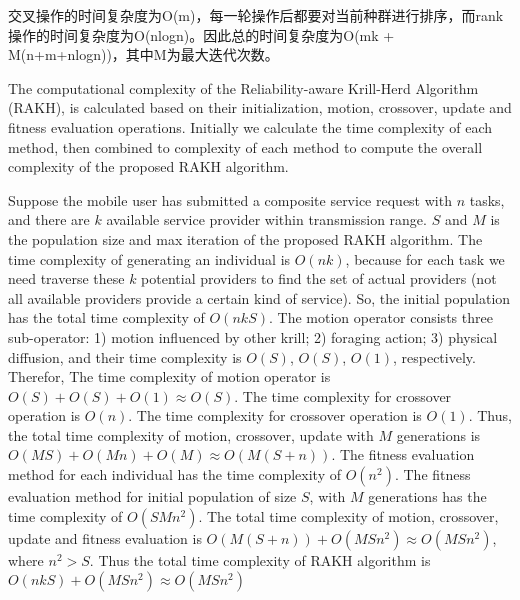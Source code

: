 \documentclass[journal]{IEEEtran}
\begin{document}
交叉操作的时间复杂度为O(m)，每一轮操作后都要对当前种群进行排序，而rank操作的时间复杂度为O(nlogn)。因此总的时间复杂度为O(mk + M(n+m+nlogn))，其中M为最大迭代次数。

The computational complexity of the Reliability-aware Krill-Herd Algorithm (RAKH), is calculated based on their initialization, motion, crossover, update and fitness evaluation operations. 
Initially we calculate the time complexity of each method, then combined to complexity of each method to compute the overall complexity of the proposed RAKH algorithm.

Suppose the mobile user has submitted a composite service request with $n$ tasks, and there are $k$ available service provider within transmission range. $S$ and $M$ is the population size and max iteration of the proposed RAKH algorithm.
The time complexity of generating an individual is $O(nk)$, because for each task we need traverse these $k$ potential providers to find the set of actual providers (not all available providers provide a certain kind of service). So, the initial population has the total time complexity of $O(nkS)$.
The motion operator consists three sub-operator: 1) motion influenced by other krill; 2) foraging action; 3) physical diffusion, and their time complexity is $O(S)$, $O(S)$, $O(1)$, respectively. Therefor, The time complexity of motion operator is $O(S)+O(S)+O(1) \approx O(S)$.
The time complexity for crossover operation is $O(n)$. The time complexity for crossover operation is $O(1)$.
Thus, the total time complexity of motion, crossover, update with $M$ generations is $O(MS) + O(Mn) + O(M) \approx O(M(S+n))$. 
The fitness evaluation method for each individual has the time complexity of $O(n^2)$. The fitness evaluation method for initial population of size $S$, with $M$ generations has the time complexity of $O(SMn^2)$.
The total time complexity of motion, crossover, update and fitness evaluation is $O(M(S+n)) + O(MSn^2) \approx O(MSn^2)$, where $n^2 > S$.
Thus the total time complexity of RAKH algorithm is $O(nkS) + O(MSn^2) \approx O(MSn^2)$
\end{document}
